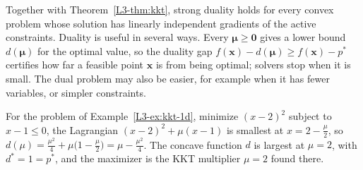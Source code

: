 Together with Theorem~\ref{L3-thm:kkt}, strong duality holds for every convex problem whose solution has linearly independent gradients of the active constraints. Duality is useful in several ways. Every $\boldsymbol{\mu} \geq \mathbf{0}$ gives a lower bound $d(\boldsymbol{\mu})$ for the optimal value, so the duality gap $f(\mathbf{x}) - d(\boldsymbol{\mu}) \geq f(\mathbf{x}) - p^*$ certifies how far a feasible point $\mathbf{x}$ is from being optimal; solvers stop when it is small. The dual problem may also be easier, for example when it has fewer variables, or simpler constraints.

\begin{example}\label{L3-ex:dual-1d}
    For the problem of Example~\ref{L3-ex:kkt-1d}, minimize $(x - 2)^2$ subject to $x - 1 \leq 0$, the Lagrangian $(x - 2)^2 + \mu(x - 1)$ is smallest at $x = 2 - \frac{\mu}{2}$, so $d(\mu) = \frac{\mu^2}{4} + \mu\big(1 - \frac{\mu}{2}\big) = \mu - \frac{\mu^2}{4}$. The concave function $d$ is largest at $\mu = 2$, with $d^* = 1 = p^*$, and the maximizer is the KKT multiplier $\mu = 2$ found there.
\end{example}

